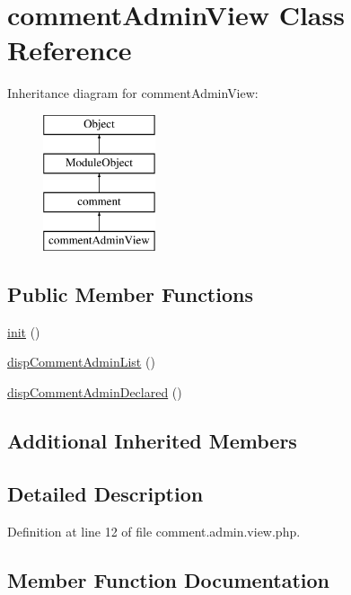 \hypertarget{classcommentAdminView}{}\section{comment\+Admin\+View Class Reference}
\label{classcommentAdminView}
Inheritance diagram for comment\+Admin\+View\+:\begin{figure}[H]
\begin{center}
\leavevmode
\includegraphics[height=4.000000cm]{classcommentAdminView}
\end{center}
\end{figure}
\subsection*{Public Member Functions}
\begin{DoxyCompactItemize}
\item 
\hyperlink{classcommentAdminView_a61733eebabe2434e133bbd516d8f68c5}{init} ()
\item 
\hyperlink{classcommentAdminView_a979a3095a55ec0e9356db470c6425639}{disp\+Comment\+Admin\+List} ()
\item 
\hyperlink{classcommentAdminView_affef73848f5ace73892e3a771d2765f5}{disp\+Comment\+Admin\+Declared} ()
\end{DoxyCompactItemize}
\subsection*{Additional Inherited Members}


\subsection{Detailed Description}


Definition at line 12 of file comment.\+admin.\+view.\+php.



\subsection{Member Function Documentation}
\mbox{\label{classcommentAdminView_affef73848f5ace73892e3a771d2765f5}} 
